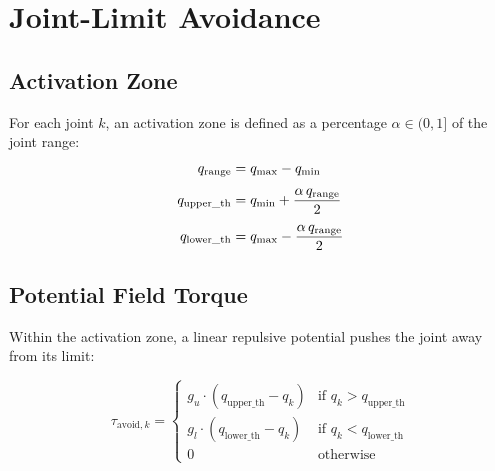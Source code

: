 \documentclass[11pt,a4paper]{article}
\begin{document}
\section{Joint-Limit Avoidance}
\label{sec:jlimit}

\subsection{Activation Zone}

For each joint $k$, an activation zone is defined as a percentage $\alpha\in(0,1]$
of the joint range:
\begin{align}
  q_{\text{range}} &= q_{\max} - q_{\min} \notag\\[4pt]
  q_{\text{upper\_th}} &= q_{\min} + \frac{\alpha\, q_{\text{range}}}{2}
  \label{eq:upper_thresh} \\[4pt]
  q_{\text{lower\_th}} &= q_{\max} - \frac{\alpha\, q_{\text{range}}}{2}
  \label{eq:lower_thresh}
\end{align}

\begin{center}
\end{center}

\subsection{Potential Field Torque}

Within the activation zone, a linear repulsive potential pushes the joint away
from its limit:

\begin{equation}
  \tau_{\text{avoid},k} =
  \begin{cases}
    g_u \cdot (q_{\text{upper\_th}} - q_k) & \text{if } q_k > q_{\text{upper\_th}} \\[6pt]
    g_l \cdot (q_{\text{lower\_th}} - q_k) & \text{if } q_k < q_{\text{lower\_th}} \\[6pt]
    0 & \text{otherwise}
  \end{cases}
  \label{eq:avoid}
\end{equation}
\end{document}
